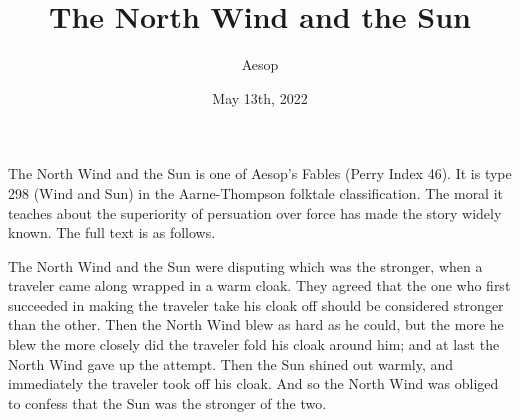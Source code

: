 \documentclass{article}
\begin{document}
\title{The North Wind and the Sun}
\author{Aesop}
\date{May 13th, 2022}
\maketitle

The North Wind and the Sun is one of Aesop's Fables (Perry Index 46).
It is type 298 (Wind and Sun) in the Aarne-Thompson folktale classification.
The moral it teaches about the superiority of persuation over force has made the story widely known. The full text is as follows.

The North Wind and the Sun were disputing which was the stronger, when a traveler came along wrapped in a warm cloak.
They agreed that the one who first succeeded in making the traveler take his cloak off should be considered stronger than the other.
Then the North Wind blew as hard as he could, but the more he blew the more closely did the traveler fold his cloak around him;
and at last the North Wind gave up the attempt. Then the Sun shined out warmly, and immediately the traveler took off his cloak.
And so the North Wind was obliged to confess that the Sun was the stronger of the two.
\end{document}
